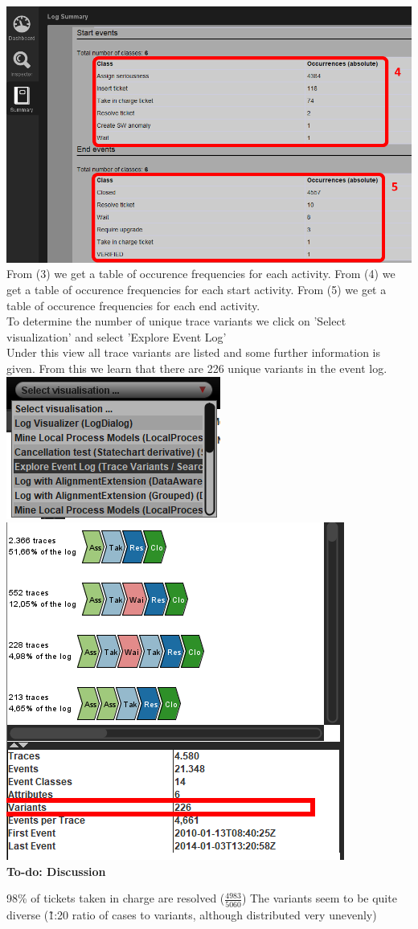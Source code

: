 \documentclass[../../main.tex]{subfiles}
\begin{document}
\includegraphics[width=0.5\columnwidth]{img/ProM_a_summary_2.png}\\
From (3) we get a table of occurence frequencies for each activity. From (4) we get a table of occurence frequencies for each start activity. From (5) we get a table of occurence frequencies for each end activity.\\
To determine the number of unique trace variants we click on 'Select visualization' and select 'Explore Event Log'\\
Under this view all trace variants are listed and some further information is given. From this we learn that there are 226 unique variants in the event log.\\
\includegraphics[width=0.5\columnwidth]{img/ProM_a_setting.png}\includegraphics[width=0.5\columnwidth]{img/ProM_a_traces.png}\\
\textbf{To-do: Discussion}

98\% of tickets taken in charge are resolved ($\frac{4983}{5060}$)
The variants seem to be quite diverse (\~1:20 ratio of cases to variants, although distributed very unevenly)
\end{document}
